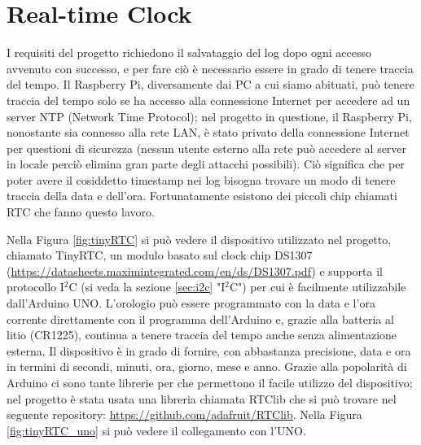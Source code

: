 \documentclass[12pt]{report}
\begin{document}
%
\section{Real-time Clock}
%

I requisiti del progetto richiedono il salvataggio del log dopo ogni accesso avvenuto con successo, e per fare ciò è necessario essere in grado di tenere traccia del tempo. Il Raspberry Pi, diversamente dai PC a cui siamo abituati, può tenere traccia del tempo solo se ha accesso alla connessione Internet per accedere ad un server NTP (Network Time Protocol); nel progetto in questione, il Raspberry Pi, nonostante sia connesso alla rete LAN, è stato privato della connessione Internet per questioni di sicurezza (nessun utente esterno alla rete può accedere al server in locale perciò elimina gran parte degli attacchi possibili). Ciò significa che per poter avere il cosiddetto timestamp nei log bisogna trovare un modo di tenere traccia della data e dell'ora. Fortunatamente esistono dei piccoli chip chiamati RTC che fanno questo lavoro. 

Nella Figura \ref{fig:tinyRTC} si può vedere il dispositivo utilizzato nel progetto, chiamato TinyRTC, un modulo basato sul clock chip DS1307 (\url{https://datasheets.maximintegrated.com/en/ds/DS1307.pdf}) e supporta il protocollo I$^2$C (si veda la sezione \ref{sec:i2c} "I$^2$C") per cui è facilmente utilizzabile dall'Arduino UNO.
L'orologio può essere programmato con la data e l'ora corrente direttamente con il programma dell'Arduino e, grazie alla batteria al litio (CR1225), continua a tenere traccia del tempo anche senza alimentazione esterna. Il dispositivo è in grado di fornire, con abbastanza precisione, data e ora in termini di secondi, minuti, ora, giorno, mese e anno. Grazie alla popolarità di Arduino ci sono tante librerie per che permettono il facile utilizzo del dispositivo; nel progetto è stata usata una libreria chiamata RTClib che si può trovare nel seguente repository: \url{https://github.com/adafruit/RTClib}. Nella Figura \ref{fig:tinyRTC_uno} si può vedere il collegamento con l'UNO.
\end{document}
